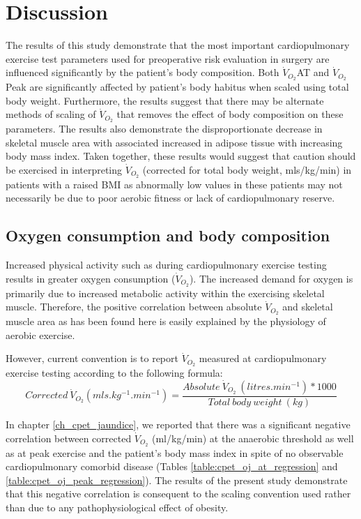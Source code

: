 


\clearpage

\section{Discussion}

The results of this study demonstrate that the most important cardiopulmonary exercise test parameters used for preoperative risk evaluation in surgery are influenced significantly by the patient's body composition. Both $\dot{V}_{O_2}$AT and $\dot{V}_{O_2}$Peak are significantly affected by patient's body habitus when scaled using total body weight. 
Furthermore, the results suggest that there may be alternate methods of scaling of $\dot{V}_{O_2}$ that removes the effect of body composition on these parameters. 
The results also demonstrate the disproportionate decrease in skeletal muscle area with associated increased in adipose tissue with increasing body mass index. 
Taken together, these results would suggest that caution should be exercised in interpreting $\dot{V}_{O_2}$ (corrected for total body weight, mls/kg/min) in patients with a raised BMI as abnormally low values in these patients may not necessarily be due to poor aerobic fitness or lack of cardiopulmonary reserve. 

\subsection{Oxygen consumption and body composition}

Increased physical activity such as during cardiopulmonary exercise testing results in greater oxygen consumption ($\dot{V}_{O_2}$). The increased demand for oxygen is primarily due to increased metabolic activity within the exercising skeletal muscle.  Therefore, the positive correlation between absolute $\dot{V}_{O_2}$ and skeletal muscle area as has been found here is easily explained by the physiology of aerobic exercise. 

However, current convention is to report $\dot{V}_{O_2}$ measured at cardiopulmonary exercise testing according to the following formula: 
\[Corrected\ \dot{V}_{O_2} (mls.kg^{-1}.min^{-1}) = \frac{Absolute\ \dot{V}_{O_2}\ (litres.min^{-1}) * 1000}{Total\ body\ weight\ (kg)}\]

In chapter \ref{ch_cpet_jaundice}, we reported that there was a significant negative correlation between corrected $\dot{V}_{O_2}$ (ml/kg/min) at the anaerobic threshold as well as at peak exercise and the patient's body mass index in spite of no observable cardiopulmonary comorbid disease (Tables \ref{table:cpet_oj_at_regression} and \ref{table:cpet_oj_peak_regression}). The results of the present study demonstrate that this negative correlation is consequent to the scaling convention used rather than due to any pathophysiological effect of obesity. 

